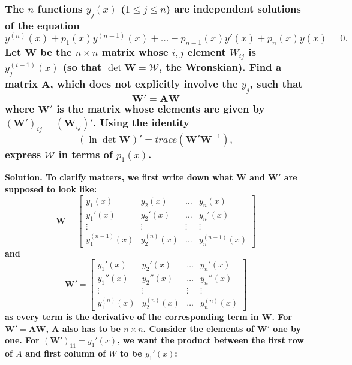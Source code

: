 \documentclass{article}
\begin{document}
\subsubsection*{The $n$ functions $y_j(x)$ ($1 \leq j \leq n$) are independent solutions of the equation
\begin{equation*}
    y^{(n)}(x) + p_1(x) y^{(n-1)}(x) + \dots + p_{n-1}(x)y'(x) + p_n(x)y(x) = 0.
\end{equation*}
Let $\mathbf{W}$ be the $n \times n$ matrix whose $i, j$ element $W_{ij}$ is $y_j^{(i-1)}(x)$ (so that $\det \mathbf{W} = \mathcal{W}$, the Wronskian). Find a matrix $\mathbf{A}$, which does not explicitly involve the $y_j$, such that 
\begin{equation*}
    \mathbf{W}' = \mathbf{A}\mathbf{W}
\end{equation*}
where $\mathbf{W}'$ is the matrix whose elements are given by $(\mathbf{W}')_{ij}=(\mathbf{W}_{ij})'$. Using the identity
\begin{equation*}
    (\ln \det \mathbf{W})' = trace(\mathbf{W}' \mathbf{W}^{-1}),
\end{equation*}
express $\mathcal{W}$ in terms of $p_1(x)$.
}
\bf Solution. \normalfont To clarify matters, we first write down what $\mathbf{W}$ and $\mathbf{W}'$ are supposed to look like:
\begin{equation*}
    \mathbf{W} = \begin{bmatrix}
        y_1(x) & y_2(x) & \dots & y_n(x) \\
        y_1'(x) & y_2' (x) & \dots & y_n'(x) \\
        \vdots & \vdots & \vdots & \vdots \\
        y_1^{(n-1)}(x) & y_2^{(n)}(x) & \dots & y_n^{(n-1)}(x)
    \end{bmatrix}
\end{equation*}
and
\begin{equation*}
    \mathbf{W}' = \begin{bmatrix}
        y_1'(x) & y_2'(x) & \dots & y_n'(x) \\
        y_1''(x) & y_2''(x) & \dots & y_n''(x) \\
        \vdots & \vdots & \vdots & \vdots \\
        y_1^{(n)}(x) & y_2^{(n)}(x) & \dots & y_n^{(n)}(x)
    \end{bmatrix}
\end{equation*}
as every term is the derivative of the corresponding term in $\mathbf{W}$. For $\mathbf{W}' = \mathbf{A}\mathbf{W}$, $\mathbf{A}$ also has to be $n \times n$. Consider the elements of $\mathbf{W}'$ one by one. For $(\mathbf{W}')_{11} = y_1'(x)$, we want the product between the first row of $A$ and first column of $W$ to be $y_1'(x)$:
\end{document}
